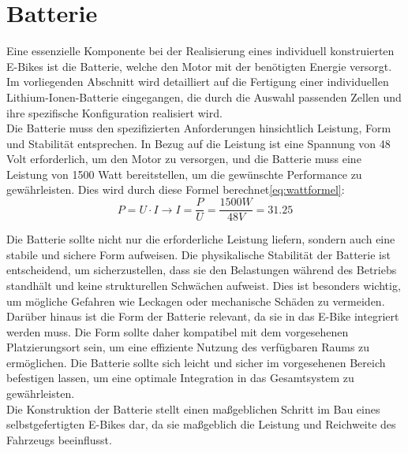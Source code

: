 
\chapter{Batterie}\label{introduction}
Eine essenzielle Komponente bei der Realisierung eines individuell konstruierten E-Bikes ist die Batterie, welche den Motor mit der benötigten Energie versorgt. Im vorliegenden Abschnitt wird detailliert auf die Fertigung einer individuellen Lithium-Ionen-Batterie eingegangen, die durch die Auswahl passenden Zellen und ihre spezifische Konfiguration realisiert wird.\\

Die Batterie muss den spezifizierten Anforderungen hinsichtlich Leistung, Form und Stabilität entsprechen. In Bezug auf die Leistung ist eine Spannung von 48 Volt erforderlich, um den Motor zu versorgen, und die Batterie muss eine Leistung von 1500 Watt bereitstellen, um die gewünschte Performance zu gewährleisten. Dies wird durch diese Formel berechnet\ref*{eq:wattformel}:\\
\begin{equation}
    P = U \cdot I \longrightarrow I = \frac{P}{U}= \frac{1500W}{48V}= 31.25
    \label{eq:wattformel}
\end{equation}
\label{introduction2}

Die Batterie sollte nicht nur die erforderliche Leistung liefern, sondern auch eine stabile und sichere Form aufweisen. Die physikalische Stabilität der Batterie ist entscheidend, um sicherzustellen, dass sie den Belastungen während des Betriebs standhält und keine strukturellen Schwächen aufweist. Dies ist besonders wichtig, um mögliche Gefahren wie Leckagen oder mechanische Schäden zu vermeiden.\\

Darüber hinaus ist die Form der Batterie relevant, da sie in das E-Bike integriert werden muss. Die Form sollte daher kompatibel mit dem vorgesehenen Platzierungsort sein, um eine effiziente Nutzung des verfügbaren Raums zu ermöglichen. Die Batterie sollte sich leicht und sicher im vorgesehenen Bereich befestigen lassen, um eine optimale Integration in das Gesamtsystem zu gewährleisten.\\

Die Konstruktion der Batterie stellt einen maßgeblichen Schritt im Bau eines selbstgefertigten E-Bikes dar, da sie maßgeblich die Leistung und Reichweite des Fahrzeugs beeinflusst.


